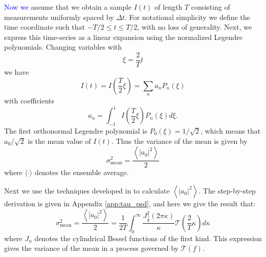 \documentclass[10pt,preprint]{aastex631}
\newcommand{\jrmadd}[1]{\textcolor{blue}{#1}}
\begin{document}
\jrmadd{Now we} assume that we obtain a sample $I(t)$ of length $T$ consisting of measurements uniformly spaced by $\Delta t$.  For notational simplicity we define the time coordinate such that $-T/2 \le t \le T/2$, with no loss of generality.  Next, we express this time-series as a linear expansion using the normalized Legendre polynomials.  Changing variables with
\begin{equation}
\xi = \frac{2}{T}t
\end{equation}
we have
\begin{equation}
I(t) = I\left(\frac{T}{2}\xi\right) = \sum_n a_n P_n(\xi)
\label{eqn:basisexpansion}
\end{equation}
with coefficients
\begin{equation}
a_n = \int_{-1}^{1} I\left(\frac{T}{2}\xi\right)P_n(\xi) d\xi.
\label{eqn:expansecoeff}
\end{equation}
The first orthonormal Legendre polynomial is $P_0(\xi) = 1/\sqrt{2}$, which means that $a_0/\sqrt{2}$ is the mean value of $I(t)$.  Thus the variance of the mean is given by
\begin{equation}
\sigma_\mathrm{mean}^2 = \frac{\left\langle \left|a_0\right|^2 \right\rangle}{2}
\label{eqn:varmean_def}
\end{equation}
where $\langle \cdot \rangle$ denotes the ensemble average.   

Next we use the techniques developed in \citet{1976JOSA...66..207N} to calculate $\left\langle \left|a_0\right|^2 \right\rangle$. The step-by-step derivation is given in Appendix \ref{app:tau_psd}, and here we give the result that:
\begin{equation}
\sigma_\mathrm{mean}^2 = \frac{\left\langle \left|a_0\right|^2 \right\rangle}{2} = \frac{1}{2T}  \int_0^{\infty} \frac{ J_{\frac{1}{2}}^2(2\pi \kappa)}{\kappa} \mathcal{T}\left( \frac{2}{T} \kappa \right) d\kappa
\label{eqn:varmean}
\end{equation}
where $J_n$ denotes the cylindrical Bessel functions of the first kind.  This expression gives the variance of the mean in a process governed by $\mathcal{T}(f)$.
\end{document}
